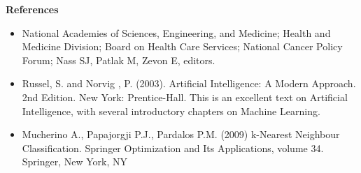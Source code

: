 \documentclass{report}
\begin{document}
\newpage

\thispagestyle{plain}
\newpage{}
\LARGE \textbf{References}
\large{}\newline






\begin{itemize}
	\item National Academies of Sciences, Engineering, and Medicine; Health and Medicine Division; Board on Health Care Services; National Cancer Policy Forum; Nass SJ, Patlak M, Zevon E, editors.
	\item Russel, S. and Norvig , P. (2003). Artificial Intelligence: A Modern Approach. 2nd Edition. New York: Prentice-Hall.
This is an excellent text on Artificial Intelligence, with several introductory chapters on Machine Learning.

	\item Mucherino A., Papajorgji P.J., Pardalos P.M. (2009) k-Nearest Neighbour Classification. Springer Optimization and Its Applications, volume 34. Springer, New York, NY
	

\end{itemize}
\end{document}
